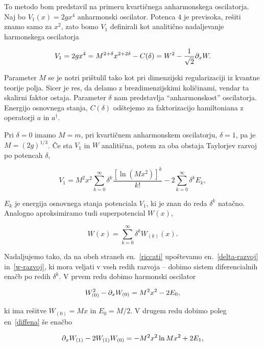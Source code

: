 To metodo bom predstavil na primeru kvarti\v cnega anharmonskega oscilatorja.
Naj bo $V_1 (x) = 2gx^4$ anharmonski oscilator. Potenca $4$ je previsoka, re\v siti znamo samo za $x^2$, zato bomo
$V_1$ definirali kot analiti\v cno nadaljevanje harmonskega oscilatorja

\begin{equation}
	V_1 = 2gx^4 = M^{2 + \delta}x^{2 + 2\delta} - C(\delta) = W^2 - \frac{1}{\sqrt{2}}\partial_x W.
\end{equation}

\ni Parameter $M$ se je notri pri\v stulil tako kot pri dimenzijski regularizaciji iz kvantne teorije polja. Sicer je res, da delamo
z brezdimenzijskimi koli\v cinami, vendar ta skalirni faktor ostaja. Parameter $\delta$ nam predstavlja "`anharmonskost"' oscilatorja.
Energijo osnovnega stanja, $C(\delta)$ od\v stejemo za faktorizacijo hamiltoniana z operatorji $a$ in $a^\dagger$.

Pri $\delta = 0$ imamo $M = m$, pri kvarti\v cnem anharmonskem oscilatorju, $\delta = 1$, pa je $M = (2g)^{1/3}$. \v Ce sta $V_1$ in
$W$ analiti\v cna, potem za oba obstaja Taylorjev razvoj po potencah $\delta$,

\begin{equation}
	V_1 = M^2x^2\sum_{k = 0}^\infty \delta^k \frac{[\ln(Mx^2)]^k}{k!} - 2 \sum_{k = 0}^\infty \delta^k E_k,
	\label{delta-razvoj}
\end{equation}

\ni $E_k$ je energija osnovnega stanja potenciala $V_1$, ki je znan do reda $\delta^k$ nata\v cno. Analogno aproksimiramo tudi superpotencial
$W(x)$,

\begin{equation}
	W(x) = \sum_{k = 0}^\infty \delta^k W_{(k)}(x).
	\label{w-razvoj}
\end{equation}

Nadaljujemo tako, da na obeh straneh en.~\eqref{riccati} upo\v stevamo en.~\eqref{delta-razvoj} in~\eqref{w-razvoj}, ki mora veljati v
vseh redih razvoja -- dobimo sistem diferencialnih ena\v cb po redih $\delta^k$. V prvem redu dobimo harmonski oscilator

\begin{equation}
	W_{(0)}^2 - \partial_x W_{(0)} = M^2x^2 - 2E_0,
	\label{diffena}
\end{equation}

\ni ki ima re\v sitve $W_{(0)} = Mx$ in $E_0 = M/2$. V drugem redu dobimo poleg en~\eqref{diffena} \v se ena\v cbo

\begin{equation}
	\partial_x W_{(1)} - 2W_{(1)}W_{(0)} = - M^2x^2 \ln Mx^2 + 2E_1,
\end{equation}

